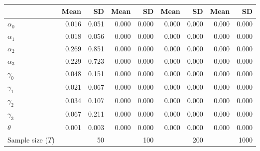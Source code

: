 
\begin{tabular}[t]{lrrrrrrrr}
\toprule
  & Mean & SD & Mean  & SD  & Mean   & SD   & Mean    & SD   \\
\midrule
$\alpha_{0}$ & 0.016 & 0.051 & 0.000 & 0.000 & 0.000 & 0.000 & 0.000 & 0.000\\
$\alpha_{1}$ & 0.018 & 0.056 & 0.000 & 0.000 & 0.000 & 0.000 & 0.000 & 0.000\\
$\alpha_{2}$ & 0.269 & 0.851 & 0.000 & 0.000 & 0.000 & 0.000 & 0.000 & 0.000\\
$\alpha_{3}$ & 0.229 & 0.723 & 0.000 & 0.000 & 0.000 & 0.000 & 0.000 & 0.000\\
$\gamma_{0}$ & 0.048 & 0.151 & 0.000 & 0.000 & 0.000 & 0.000 & 0.000 & 0.000\\
$\gamma_{1}$ & 0.021 & 0.067 & 0.000 & 0.000 & 0.000 & 0.000 & 0.000 & 0.000\\
$\gamma_{2}$ & 0.034 & 0.107 & 0.000 & 0.000 & 0.000 & 0.000 & 0.000 & 0.000\\
$\gamma_{3}$ & 0.067 & 0.211 & 0.000 & 0.000 & 0.000 & 0.000 & 0.000 & 0.000\\
$\theta$ & 0.001 & 0.003 & 0.000 & 0.000 & 0.000 & 0.000 & 0.000 & 0.000\\
Sample size ($T$) &  & 50 &  & 100 &  & 200 &  & 1000\\
\bottomrule
\end{tabular}
